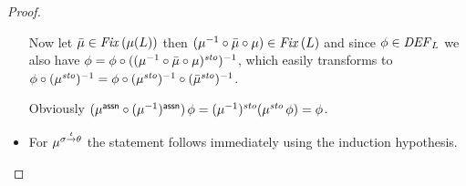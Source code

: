 \documentclass[12pt,a4paper]{report}
\newcommand{\ssto}{\nstyle{sto}}
\newcommand{\DEF}{\nstyle{DEF}}
\newcommand{\Fix}[1]{\nstyle{Fix}\,(#1)}
\begin{document}
\begin{proof}
\begin{itemize}
          Now let $\bar{\mu}\in\Fix{\mu(L)}$ then $(\mu^{-1}\circ \bar{\mu} \circ \mu) \in \Fix{L}$ and since
          $\phi\in\DEF_L$ we also have $\phi = \phi \circ ((\mu^{-1}\circ \bar{\mu} \circ \mu)^\ssto)^{-1}$,
          which easily transforms to $\phi\circ (\mu^\ssto)^{-1} = \phi \circ (\mu^\ssto)^{-1} \circ (\bar{\mu}^\ssto)^{-1}$.

          Obviously $(\mu^\tassn\circ(\mu^{-1})^\tassn)\,\phi = (\mu^{-1})^\ssto(\mu^\ssto\,\phi) = \phi$.

    \item For $\mu^{\sigma\stackrel{t}{\to}\theta}$ the statement follows immediately using the induction hypothesis.
%

\end{itemize}
\end{proof}
\end{document}
